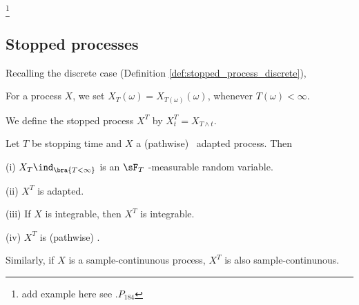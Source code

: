 \footnote{add example here see \cite{Rogers_1994}.$P_{184}$}




\subsection{Stopped processes}

Recalling the discrete case (Definition \ref{def:stopped_process_discrete}),

\begin{definition}\label{def:stopped_process_continuous}
For a process $X$, we set $X_T (\omega) = X_{T(\omega)}(\omega)$, whenever $T(\omega) < \infty$.

We define the stopped process $X^T$ by $X^T_t = X_{T\land t}$.
\end{definition}

\begin{proposition}\label{pro:cadlag_adapted_process_property}
Let $T$ be stopping time and $X$ a (pathwise) \cadlag\ adapted process. Then
\ben
\item [(i)] $X_T\ind_{\bra{T < \infty}}$ is an $\sF_T$ -measurable random variable.
\item [(ii)] $X^T$ is adapted.
\item [(iii)] If $X$ is integrable, then $X^T$ is integrable.
\item [(iv)] $X^T$ is (pathwise) \cadlag.
\een
\end{proposition}

\begin{remark}
Similarly, if $X$ is a sample-continunous process, $X^T$ is also sample-continunous.
\end{remark}

